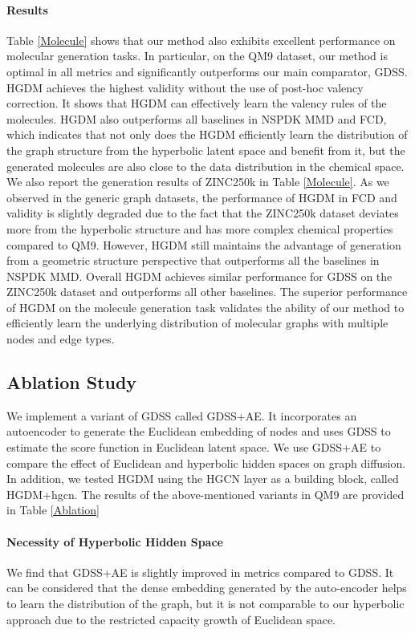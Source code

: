 \documentclass[letterpaper]{article} %
\begin{document}
\paragraph{Results}
Table \ref{Molecule} shows that our method also exhibits excellent performance on molecular generation tasks. In particular, on the QM9 dataset, our method is optimal in all metrics and significantly outperforms our main comparator, GDSS. HGDM achieves the highest validity without the use of post-hoc valency correction. It shows that HGDM can effectively learn the valency rules of the molecules. HGDM also outperforms all baselines in NSPDK MMD and FCD, which indicates that not only does the HGDM efficiently learn the distribution of the graph structure from the hyperbolic latent space and benefit from it, but the generated molecules are also close to the data distribution in the chemical space.
We also report the generation results of ZINC250k in Table \ref{Molecule}. As we observed in the generic graph datasets, the performance of HGDM in FCD and validity is slightly degraded due to the fact that the ZINC250k dataset deviates more from the hyperbolic structure and has more complex chemical properties compared to QM9. However, HGDM still maintains the advantage of generation from a geometric structure perspective that outperforms all the baselines in NSPDK MMD. Overall HGDM achieves similar performance for GDSS on the ZINC250k dataset and outperforms all other baselines. The superior performance of HGDM on the molecule generation task validates the ability of our method to efficiently learn the underlying distribution of molecular graphs with multiple nodes and edge types.

\subsection{Ablation Study}


We implement a variant of GDSS called GDSS+AE. It incorporates an autoencoder to generate the Euclidean embedding of nodes and uses GDSS to estimate the score function in Euclidean latent space. We use GDSS+AE to compare the effect of Euclidean and hyperbolic hidden spaces on graph diffusion. In addition, we tested HGDM using the HGCN layer as a building block, called HGDM+hgcn.
The results of the above-mentioned variants in QM9 are provided in Table \ref{Ablation}
\paragraph{Necessity of Hyperbolic Hidden Space}
We find that GDSS+AE is slightly improved in metrics compared to GDSS.
It can be considered that the dense embedding generated by the auto-encoder helps to learn the distribution of the graph, but it is not comparable to our hyperbolic approach due to the restricted capacity growth of Euclidean space.
\end{document}

